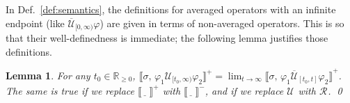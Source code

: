 \documentclass[envcountsect,orivec]{llncs} \usepackage{etex} \usepackage[]{graphicx}
\newif\ifignore \ignorefalse
\newcommand{\auxproof}[1]{
  \ifignore\mbox{}\newline
  \textbf{BEGIN: AUX-PROOF} \dotfill\newline
  {#1}\mbox{}\newline
  \textbf{END: AUX-PROOF}\dotfill\newline
  \fi}
\newtheorem{mylemma}[mytheorem]{Lemma}
\def\myqed{\qed}
\newcommand{\R}{{\mathbb{R}}}
\newcommand{\place}{\underline{\phantom{n}}\,}
\newcommand{\UntilOp}[1]{\mathbin{\mathcal{U}_{#1}}}
\newcommand{\Release}[1]{\mathbin{\mathcal{R}_{#1}}}
\newcommand{\TUntil}[1]{\mathbin{\overline{\mathcal{U}}_{#1}}}
\newcommand{\Robust}[2]{{ \llbracket #1,\, #2 \rrbracket}}
\newcommand{\sem}[1]{\llbracket #1 \rrbracket}
\newcommand{\Lim}[1]{{\displaystyle{\lim_{#1}}}}
\newcommand{\AvSTL}{\textbf{AvSTL}}
\newcommand{\C}{\mathcal{C}}
\newcommand{\Rnn}{\R_{\ge 0}}
\begin{document}
  In Def.~\ref{def:semantics},
 the definitions for averaged operators with an infinite endpoint
 (like $\TUntil{[0, \infty)}{\varphi}$) are given in terms of non-averaged
 operators. This is so that their well-definedness is immediate; the
 following lemma justifies those definitions.
\begin{mylemma}\label{lem:CorrespondenceBetweenUntilAndTUntil}
  For any $t_0 \in \Rnn$, 
  \begin{math}
    \Robust{\sigma}{\varphi_1 \UntilOp{[t_0, \infty)} \varphi_2}^{+} 
      =
      \Lim{t \to \infty}
      \Robust{\sigma}{\varphi_1 \TUntil{[t_0, t]} \varphi_2}^{+}
  \end{math}. 
  The same is true if we replace $\sem{\place}^{+}$ with 
$\sem{\place}^{-}$, and if we replace $\UntilOp{}$ with $\Release{}$.
\myqed
\end{mylemma}

















\auxproof{

\begin{mylemma}[logical monotonicity]
  \label{lem:monotonicity}
  Let $\C$ be a \emph{positive context}, that is, an $\AvSTL$ formula 
  with a hole $[\,]$ at a positive position. We have
\begin{align*}
    \begin{array}{rcl}
      \forall \sigma.\; \Robust{\sigma}{\varphi}^{+} 
      \leq \Robust{\sigma}{\varphi'}^{+}
      \quad&\text{implies}
      &\quad 
        \forall \sigma.\; \Robust{\sigma}{\C[\varphi]}^{+} 
        \leq
        \Robust{\sigma}{\C[\varphi']}^{+}\enspace;\;\text{and}\\
      \forall \sigma.\; \Robust{\sigma}{\varphi}^{-} 
      \leq \Robust{\sigma}{\varphi'}^{-}
      \quad&\text{implies}
      &\quad 
        \forall \sigma.\; \Robust{\sigma}{\C[\varphi]}^{-} 
        \leq 
        \Robust{\sigma}{\C[\varphi']}^{-} \enspace.
    \end{array}  
  \end{align*}
\end{mylemma}
\begin{myproof}
  By induction on the construction of the positive context $\C$; the
  latter is thought of as a formula of the negative normal form with a
  hole.  \myqed
\end{myproof}

}
\end{document}
